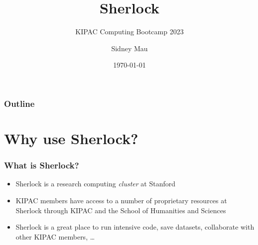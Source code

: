 \documentclass[aspectratio=169]{beamer}
\title{Sherlock}
\subtitle{KIPAC Computing Bootcamp 2023}
\author[S. Mau]{Sidney Mau}
\institute[Stanford]{Stanford University}
\date[\today]{\today}
\begin{document}

\frame{\titlepage}

\begin{frame}
	\frametitle{Outline}
	\tableofcontents
\end{frame}


\section{Why use Sherlock?}

\frame{\sectionpage}

\begin{frame}
	\frametitle{What is Sherlock?}
	\begin{itemize}
		\item Sherlock is a research computing \emph{cluster} at Stanford
		\item KIPAC members have access to a number of proprietary resources at Sherlock through KIPAC and the School of Humanities and Sciences
		\item Sherlock is a great place to run intensive code, save datasets, collaborate with other KIPAC members, \dots
	\end{itemize}
\end{frame}
\end{document}
